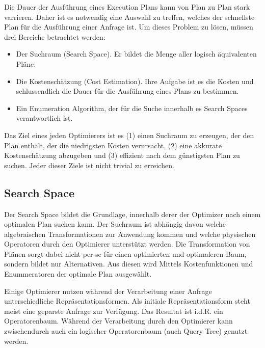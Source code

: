 Die Dauer der Ausführung eines Execution Plans kann von Plan zu Plan stark varrieren. Daher ist es notwendig eine Auswahl zu treffen, welches der schnellste Plan für die Ausführung einer Anfrage ist. Um dieses Problem zu lösen, müssen drei Bereiche betrachtet werden:
\begin{itemize}
\item Der Suchraum (Search Space). Er bildet die Menge aller logisch äquivalenten Pläne.
\item Die Kostenschätzung (Cost Estimation). Ihre Aufgabe ist es die Kosten und schlussendlich die Dauer für die Ausführung eines Plans zu bestimmen.
\item Ein Enumeration Algorithm, der für die Suche innerhalb es Search Spaces verantwortlich ist.
\end{itemize}

Das Ziel eines jeden Optimierers ist es (1) einen Suchraum zu erzeugen, der den Plan enthält, der die niedrigsten Kosten verursacht, (2) eine akkurate Kostenschätzung abzugeben und (3) effizient nach dem günstigsten Plan zu suchen. Jeder dieser Ziele ist nicht trivial zu erreichen.



\subsection{Search Space}

Der Search Space bildet die Grundlage, innerhalb derer der Optimizer nach einem optimalen Plan suchen kann. Der Suchraum ist abhängig davon welche algebraischen Transformationen zur Anwendung kommen und welche physischen Operatoren durch den Optimierer unterstützt werden. Die Transformation von Plänen sorgt dabei nicht per se für einen optimierten und optimaleren Baum, sondern bildet nur Alternativen. Aus diesen wird Mittels Kostenfunktionen und Enummeratoren der optimale Plan ausgewählt.

Einige Optimierer nutzen während der Verarbeitung einer Anfrage unterschiedliche Repräsentationsformen. Als initiale Repräsentationsform steht meist eine geparste Anfrage zur Verfügung. Das Resultat ist i.d.R. ein Operatorenbaum. Während der Verarbeitung durch den Optimierer kann zwischendurch auch ein logischer Operatorenbaum (auch Query Tree) genutzt werden.

